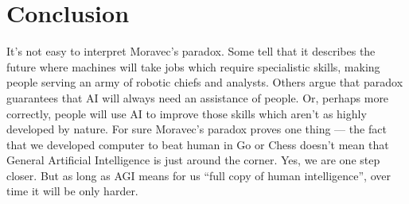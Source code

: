 \documentclass[a4paper,10pt]{article} %
\begin{document}
\section{Conclusion}
It’s not easy to interpret Moravec’s paradox. Some tell that it describes the future where machines will take jobs which require specialistic skills, making people serving an army of robotic chiefs and analysts. Others argue that paradox guarantees that AI will always need an assistance of people. Or, perhaps more correctly, people will use AI to improve those skills which aren’t as highly developed by nature.
For sure Moravec’s paradox proves one thing — the fact that we developed computer to beat human in Go or Chess doesn’t mean that General Artificial Intelligence is just around the corner. Yes, we are one step closer. But as long as AGI means for us “full copy of human intelligence”, over time it will be only harder.
\end{document}
